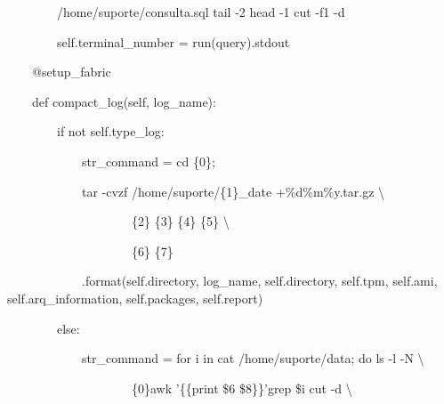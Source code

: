 {\ttfamily\color[rgb]{0.10980392,0.10980392,0.10980392}
    \ \ \ \ \ \ \ \ /home/suporte/consulta.sql {\textbar} tail -2 {\textbar}head -1 {\textbar} cut -f1 -d{\textquotedbl}
    {\textquotedbl} {\textquotedbl}{\textquotedbl}{\textquotedbl}}

{\ttfamily\color[rgb]{0.10980392,0.10980392,0.10980392}
    \ \ \ \ \ \ \ \ self.terminal\_number = run(query).stdout}


    \bigskip

{\ttfamily\color[rgb]{0.10980392,0.10980392,0.10980392}
    \ \ \ \ @setup\_fabric}

{\ttfamily\color[rgb]{0.10980392,0.10980392,0.10980392}
    \ \ \ \ def compact\_log(self, log\_name):}

{\ttfamily\color[rgb]{0.10980392,0.10980392,0.10980392}
    \ \ \ \ \ \ \ \ if not self.type\_log:}

{\ttfamily\color[rgb]{0.10980392,0.10980392,0.10980392}
    \ \ \ \ \ \ \ \ \ \ \ \ str\_command = {\textquotedbl}{\textquotedbl}{\textquotedbl}cd \{0\};}

{\ttfamily\color[rgb]{0.10980392,0.10980392,0.10980392}
    \ \ \ \ \ \ \ \ \ \ \ \ tar -cvzf /home/suporte/\{1\}\_{\textasciigrave}date +\%d\%m\%y{\textasciigrave}.tar.gz
    {\textbackslash}}

{\ttfamily\color[rgb]{0.10980392,0.10980392,0.10980392}
    \ \ \ \ \ \ \ \ \ \ \ \ \ \ \ \ \ \ \ \ \{2\} \{3\} \{4\} \{5\} {\textbackslash}}

{\ttfamily\color[rgb]{0.10980392,0.10980392,0.10980392}
    \ \ \ \ \ \ \ \ \ \ \ \ \ \ \ \ \ \ \ \ \{6\} \{7\}}

{\ttfamily\color[rgb]{0.10980392,0.10980392,0.10980392}
    \ \ \ \ \ \ \ \ \ \ \ \ {\textquotedbl}{\textquotedbl}{\textquotedbl}.format(self.directory, log\_name, self.directory,
            self.tpm, self.ami, self.arq\_information, self.packages, self.report)}

{\ttfamily\color[rgb]{0.10980392,0.10980392,0.10980392}
    \ \ \ \ \ \ \ \ else:}

{\ttfamily\color[rgb]{0.10980392,0.10980392,0.10980392}
    \ \ \ \ \ \ \ \ \ \ \ \ str\_command = {\textquotedbl}{\textquotedbl}{\textquotedbl}for i in {\textasciigrave}cat
        /home/suporte/data{\textasciigrave}; do ls -l -N {\textbackslash}}

{\ttfamily\color[rgb]{0.10980392,0.10980392,0.10980392}
    \ \ \ \ \ \ \ \ \ \ \ \ \ \ \ \ \ \ \ \ \{0\}{\textbar}awk '\{\{print \$6{\textquotedbl}
    {\textquotedbl}\$8\}\}'{\textbar}grep \$i {\textbar}cut -d {\textquotedbl} {\textquotedbl} {\textbackslash}}

